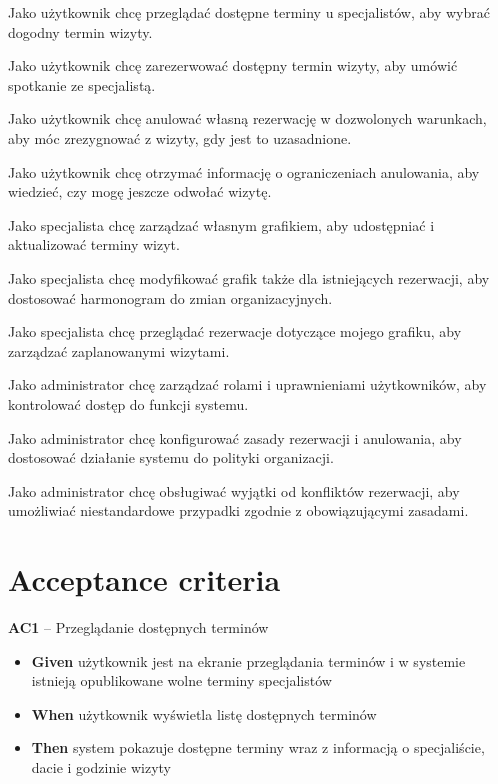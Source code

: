 \documentclass[12pt,a4paper]{article}
\begin{document}
\begin{description}[leftmargin=1.8cm, labelwidth=1.3cm, labelsep=0.5cm, style=nextline]
  \item[US1] Jako użytkownik chcę przeglądać dostępne terminy u specjalistów, aby wybrać dogodny termin wizyty.
\item[US2] Jako użytkownik chcę zarezerwować dostępny termin wizyty, aby umówić spotkanie ze specjalistą.
\item[US3] Jako użytkownik chcę anulować własną rezerwację w dozwolonych warunkach, aby móc zrezygnować z wizyty, gdy jest to uzasadnione.
\item[US4] Jako użytkownik chcę otrzymać informację o ograniczeniach anulowania, aby wiedzieć, czy mogę jeszcze odwołać wizytę.
\item[US5] Jako specjalista chcę zarządzać własnym grafikiem, aby udostępniać i aktualizować terminy wizyt.
\item[US6] Jako specjalista chcę modyfikować grafik także dla istniejących rezerwacji, aby dostosować harmonogram do zmian organizacyjnych.
\item[US7] Jako specjalista chcę przeglądać rezerwacje dotyczące mojego grafiku, aby zarządzać zaplanowanymi wizytami.
\item[US8] Jako administrator chcę zarządzać rolami i uprawnieniami użytkowników, aby kontrolować dostęp do funkcji systemu.
\item[US9] Jako administrator chcę konfigurować zasady rezerwacji i anulowania, aby dostosować działanie systemu do polityki organizacji.
\item[US10] Jako administrator chcę obsługiwać wyjątki od konfliktów rezerwacji, aby umożliwiać niestandardowe przypadki zgodnie z obowiązującymi zasadami.
\end{description}

\section{Acceptance criteria}

\textbf{AC1} -- Przeglądanie dostępnych terminów
\begin{itemize}[itemsep=2pt]
\item \textbf{Given} użytkownik jest na ekranie przeglądania terminów i w systemie istnieją opublikowane wolne terminy specjalistów
\item \textbf{When} użytkownik wyświetla listę dostępnych terminów
\item \textbf{Then} system pokazuje dostępne terminy wraz z informacją o specjaliście, dacie i godzinie wizyty
\end{itemize}
\end{document}
